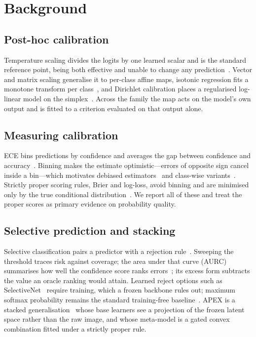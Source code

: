 \documentclass[conference]{IEEEtran}
\begin{document}
\section{Background}

\subsection{Post-hoc calibration}
Temperature scaling divides the logits by one learned scalar and is the standard
reference point, being both effective and unable to change any
prediction~\cite{guo2017calibration}. Vector and matrix scaling generalise it to
per-class affine maps, isotonic regression fits a monotone transform per
class~\cite{zadrozny2002transforming}, and Dirichlet calibration places a
regularised log-linear model on the simplex~\cite{kull2019beyond}. Across the
family the map acts on the model's own output and is fitted to a criterion
evaluated on that output alone.

\subsection{Measuring calibration}
ECE bins predictions by confidence and averages the gap between confidence and
accuracy~\cite{naeini2015obtaining}. Binning makes the estimate optimistic---errors
of opposite sign cancel inside a bin---which motivates debiased
estimators~\cite{kumar2019verified} and class-wise
variants~\cite{nixon2019measuring}. Strictly proper scoring rules, Brier and
log-loss, avoid binning and are minimised only by the true conditional
distribution~\cite{brier1950verification,gneiting2007strictly}. We report all of
these and treat the proper scores as primary evidence on probability quality.

\subsection{Selective prediction and stacking}
Selective classification pairs a predictor with a rejection
rule~\cite{elyaniv2010foundations}. Sweeping the threshold traces risk against
coverage; the area under that curve (AURC) summarises how well the confidence
score ranks errors~\cite{geifman2017selective}; its excess form subtracts the
value an oracle ranking would attain. Learned reject options such as
SelectiveNet~\cite{geifman2019selectivenet} require training, which a frozen
backbone rules out; maximum softmax probability remains the standard training-free
baseline~\cite{hendrycks2017baseline}. APEX is a stacked
generalisation~\cite{wolpert1992stacked} whose base learners see a projection of
the frozen latent space rather than the raw image, and whose meta-model is a gated
convex combination fitted under a strictly proper rule.
\end{document}
